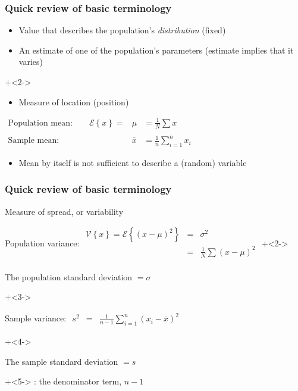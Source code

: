 \begin{frame}\frametitle{Quick review of basic terminology}
	{}
	\begin{itemize}
		\item	Value that describes the population's \emph{distribution} (fixed)
	\end{itemize}

	{}
	\begin{itemize}
		\item	An estimate of one of the population's parameters (estimate implies that it varies)
	\end{itemize}
	
	\onslide+<2->{

	{}
	\begin{itemize}
		\item	Measure of location (position)
	\end{itemize}

	$
	\begin{array}{rcl}
		\text{Population mean:} \qquad \mathcal{E}\left\{x \right\} = &\mu &= \displaystyle \frac{1}{N}\sum{x} \\
		\\
		\text{Sample mean:} \qquad &\bar{x} &= \displaystyle \frac{1}{n}\sum_{i=1}^{n}{x_i}
	\end{array}
	$
	\begin{itemize}
		\item	Mean by itself is not sufficient to describe a (random) variable
	\end{itemize}
	}
\end{frame}

\begin{frame}\frametitle{Quick review of basic terminology}
	{}
	\begin{itemize}
		\item	Measure of spread, or variability
		\item	Population variance:
	$
	\begin{array}{rcl}
		\mathcal{V}\left\{x\right\} = \mathcal{E}\left\{ (x - \mu )^2\right\} &=& \sigma^2 \\
		&=& \displaystyle \frac{1}{N}\sum{(x-\mu)^2} \\
	\end{array}
	$
	\onslide+<2->{
		\item	The population {\color{purple}standard deviation} $= \sigma$
	}
	\end{itemize}
	\begin{itemize}
		\onslide+<3->{
		\item	Sample variance:
		$
		\begin{array}{rcl}
			s^2 &=& \displaystyle \frac{1}{n-1}\sum_{i=1}^{n}{(x_i - \bar{x})^2}
		\end{array}
		$
		}
		\onslide+<4->{
		
		\item	The sample {\color{purple}standard deviation} $= s$
		}
	\end{itemize}
	\onslide+<5->{
		{}: the denominator term, $n-1$
	}
\end{frame}

